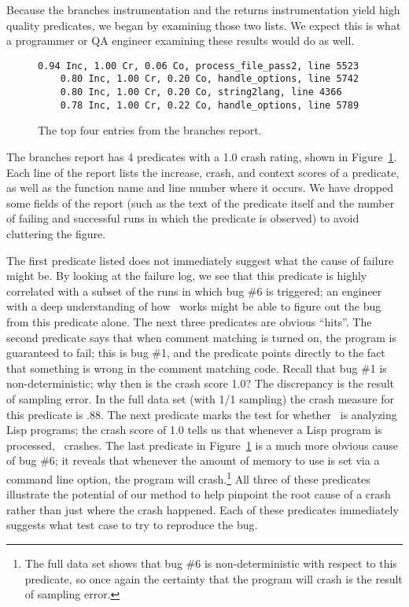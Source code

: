 Because the branches instrumentation and the returns instrumentation
yield high quality predicates, we began by examining those two lists.  We expect this is
what a programmer or QA engineer examining these results would do as well.

\begin{figure}
\centering
\begin{small}
  \begin{BVerbatim}[gobble=4]
    0.94 Inc, 1.00 Cr, 0.06 Co, process_file_pass2, line 5523
    0.80 Inc, 1.00 Cr, 0.20 Co, handle_options, line 5742
    0.80 Inc, 1.00 Cr, 0.20 Co, string2lang, line 4366
    0.78 Inc, 1.00 Cr, 0.22 Co, handle_options, line 5789
  \end{BVerbatim}
\end{small}

\caption{The top four entries from the branches report.}
\label{fig-report}
\end{figure}

The branches report has 4 predicates with a 1.0 crash rating, shown in
Figure~\ref{fig-report}.  Each line of the report lists the increase,
crash, and context scores of a predicate, as well as the function name
and line number where it occurs.  We have dropped some fields of the
report (such as the text of the predicate itself and the number of
failing and successful runs in which the predicate is observed) to
avoid cluttering the figure.

The first predicate listed does not immediately suggest what the cause
of failure might be. By looking at the failure log, we see that this predicate
is highly correlated with a subset of the runs in which bug \#6 is
triggered; an engineer with a deep understanding of how \moss\ works
might be able to figure out the bug from this predicate alone.
The next three predicates are obvious ``hits''. The second predicate
says that when comment matching is turned on, the program is
guaranteed to fail; this is bug \#1, and the predicate points directly
to the fact that something is wrong in the comment matching code.
Recall that bug \#1 is non-deterministic; why then is the crash score 1.0?
The discrepancy is the result of sampling error.  In the full data set
(with 1/1 sampling) the crash measure for this predicate is .88.  The
next predicate marks the test for whether \moss\ is analyzing Lisp
programs; the crash score of 1.0 tells us that whenever a Lisp program is
processed, \moss\ crashes.  The last predicate in
Figure~\ref{fig-report} is a much more obvious cause of 
bug \#6; it reveals that whenever the amount of memory to use is set
via a command line option, the program will crash.\footnote{The full data set shows that bug \#6 is non-deterministic with respect to this predicate, so once again the certainty that the program will crash is the result of sampling error.}  All three of these predicates illustrate the potential of our method to
help pinpoint the root cause of a crash rather than just where the crash
happened.  Each of these predicates immediately suggests
what test case to try to reproduce the bug. 


